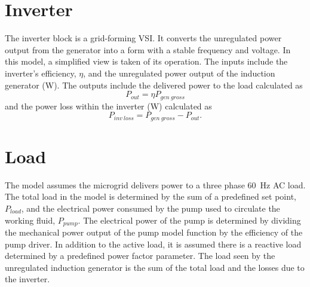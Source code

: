 \begin{comment}
First the inductive and capacitive reactances of the rotor, stator, and external excitation capacitors are calculated at the rated frequency of the machine, along with the equivalent load resistance for the given input voltage. Next, the electrical frequency is calculated based off the real portion of the admittance balance equations. With the frequency the machine slip can be determined as well. Next, the imaginary portion of the admittance balance equation can be used to solve for the core reactance. Internal voltage of the machine is then interpolated from the core reactance based off of the magnetization curves. The new line voltage is determined as well to feed back into the next iteration of the function.

With all components of the machine known, the power output and losses can be calculated in the same manner as the regulated induction generator seen above. The power generated, $P_{gen\ gross}$, is fed into the input of the inverter block and the losses, $P_{gen\ loss}$ are used in the feedback control.
\end{comment}

\section{Inverter}
The inverter block is a grid-forming VSI. It converts the unregulated power output from the generator into a form with a stable frequency and voltage. In this model, a simplified view is taken of its operation. The inputs include the inverter's efficiency, $\eta$, and the unregulated power output of the induction generator (\si{\watt}). The outputs include the delivered power to the load calculated as
\begin{equation}
P_{out} = \eta P_{gen\ gross}
\end{equation} 
and the power loss within the inverter (\si{\watt}) calculated as 
\begin{equation}
P_{inv\ loss} = P_{gen\ gross} - P_{out}. 
\end{equation}

\section{Load}
The model assumes the microgrid delivers power to a three phase \SI{60}{\hertz} AC load. The total load in the model is determined by the sum of a predefined set point, $P_{load}$, and the electrical power consumed by the pump used to circulate the working fluid, $P_{pump}$. The electrical power of the pump is determined by dividing the mechanical power output of the pump model function by the efficiency of the pump driver. In addition to the active load, it is assumed there is a reactive load determined by a predefined power factor parameter. 
The load seen by the unregulated induction generator is the sum of the total load and the losses due to the inverter. 

